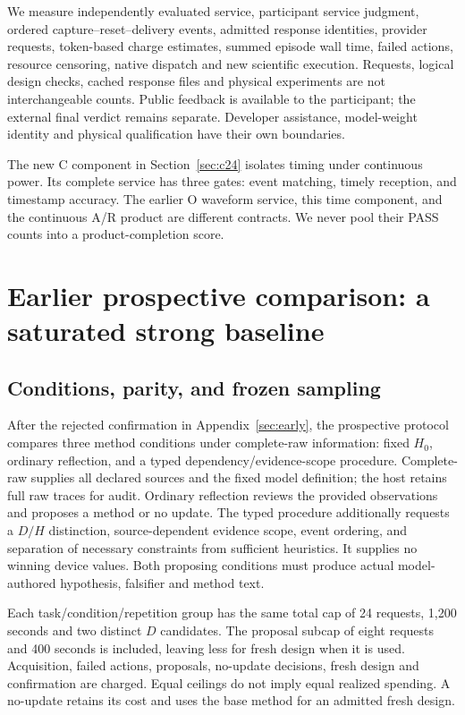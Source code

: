 We measure independently evaluated service, participant service judgment,
ordered capture--reset--delivery events, admitted response identities, provider
requests, token-based charge estimates, summed episode wall time, failed actions,
resource censoring, native dispatch and new scientific execution. Requests,
logical design checks, cached response files and physical experiments are not
interchangeable counts. Public feedback is available to the participant; the
external final verdict remains separate. Developer assistance, model-weight
identity and physical qualification have their own boundaries.

The new C component in Section~\ref{sec:c24} isolates timing under continuous
power. Its complete service has three gates: event matching, timely reception,
and timestamp accuracy. The earlier O waveform service, this time component,
and the continuous A/R product are different contracts. We never pool their
PASS counts into a product-completion score.

\section{Earlier prospective comparison: a saturated strong baseline}
\subsection{Conditions, parity, and frozen sampling}
After the rejected confirmation in Appendix~\ref{sec:early}, the prospective protocol compares three method conditions under complete-raw information:
fixed $H_0$, ordinary reflection, and a typed dependency/evidence-scope procedure.
Complete-raw supplies all declared sources and the fixed model definition;
the host retains full raw traces for audit. Ordinary reflection reviews the
provided observations and proposes a method or no update. The typed procedure
additionally requests a $D/H$ distinction, source-dependent evidence scope,
event ordering, and separation of necessary constraints from sufficient
heuristics. It supplies no winning device values. Both proposing conditions
must produce actual model-authored hypothesis, falsifier and method text.

Each task/condition/repetition group has the same total cap of 24 requests,
1,200 seconds and two distinct $D$ candidates. The proposal subcap of eight
requests and 400 seconds is included, leaving less for fresh design when it
is used. Acquisition, failed actions, proposals, no-update decisions, fresh
design and confirmation are charged. Equal ceilings do not imply equal
realized spending. A no-update retains its cost and uses the base method for
an admitted fresh design.

